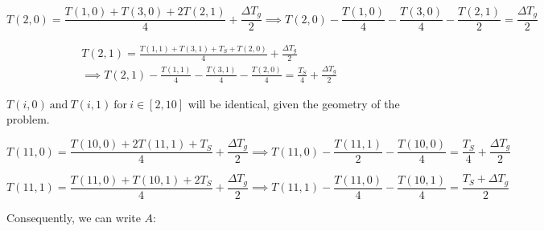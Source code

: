 \begin{equation}\label{eq66}
T(2,0) = \frac{T(1,0) + T(3,0) + 2T(2, 1)}{4} + \frac{\Delta T_g}{2} \implies T(2,0) - \frac{T(1,0)}{4} - \frac{T(3,0)}{4} - \frac{T(2,1)}{2} = \frac{\Delta T_g}{2}
\end{equation}

\begin{equation}\label{eq67}
\begin{aligned}
T(2,1) = \frac{T(1,1) + T(3,1) + T_S + T(2,0)}{4} + \frac{\Delta T_g}{2} \\ \implies T(2,1) - \frac{T(1,1)}{4} - \frac{T(3,1)}{4} - \frac{T(2,0)}{4} = \frac{T_S}{4} + \frac{\Delta T_g}{2}
\end{aligned}
\end{equation}

$T(i,0)\ \text{and}\ T(i,1)\ \text{for}\ i \in [2,10]$ will be identical, given the geometry of the problem.

\begin{equation}\label{eq68}
T(11,0) = \frac{T(10,0) + 2T(11,1) + T_S}{4} + \frac{\Delta T_g}{2} \implies T(11,0) - \frac{T(11,1)}{2} - \frac{T(10,0)}{4} = \frac{T_S}{4} + \frac{\Delta T_g}{2}
\end{equation}

\begin{equation}\label{eq69}
T(11,1) = \frac{T(11,0) + T(10,1) + 2T_S}{4} + \frac{\Delta T_g}{2} \implies T(11,1) - \frac{T(11,0)}{4} - \frac{T(10,1)}{4} = \frac{T_S + \Delta T_g}{2}
\end{equation}

Consequently, we can write $A$:

